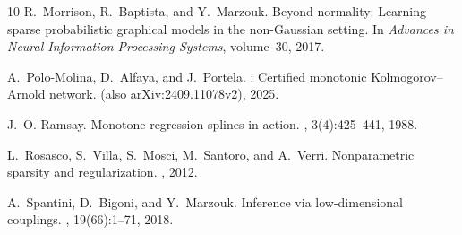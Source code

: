 \documentclass[11pt,a4paper]{article}
\theoremstyle{plain}
\theoremstyle{definition}
\theoremstyle{remark}
\begin{document}
\begin{thebibliography}{10}
R.~Morrison, R.~Baptista, and Y.~Marzouk.
\newblock Beyond normality: Learning sparse probabilistic graphical models in the non-{G}aussian setting.
\newblock In {\em Advances in Neural Information Processing Systems}, volume~30, 2017.

A.~Polo-Molina, D.~Alfaya, and J.~Portela.
: Certified monotonic {K}olmogorov--{A}rnold network.
 (also arXiv:2409.11078v2), 2025.

J.~O. Ramsay.
\newblock Monotone regression splines in action.
, 3(4):425--441, 1988.

L.~Rosasco, S.~Villa, S.~Mosci, M.~Santoro, and A.~Verri.
\newblock Nonparametric sparsity and regularization.
, 2012.

A.~Spantini, D.~Bigoni, and Y.~Marzouk.
\newblock Inference via low-dimensional couplings.
, 19(66):1--71, 2018.

\end{thebibliography}
\end{document}
